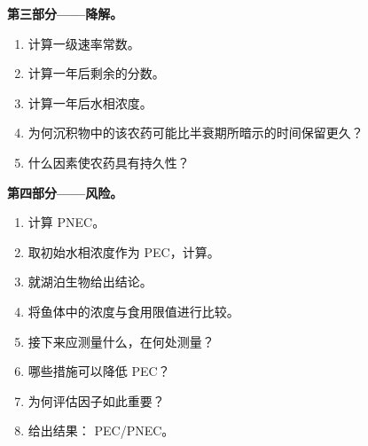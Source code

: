 \begin{problem}
\medskip\noindent\textbf{第三部分——降解。}
\begin{enumerate}[resume]
  \item 计算一级速率常数。
  \item 计算一年后剩余的分数。
  \item 计算一年后水相浓度。
  \item 为何沉积物中的该农药可能比半衰期所暗示的时间保留更久？
  \item 什么因素使农药具有持久性？
\end{enumerate}

\medskip\noindent\textbf{第四部分——风险。}
\begin{enumerate}[resume]
  \item 计算 PNEC。
  \item 取初始水相浓度作为 PEC，计算。
  \item 就湖泊生物给出结论。
  \item 将鱼体中的浓度与食用限值进行比较。
  \item 接下来应测量什么，在何处测量？
  \item 哪些措施可以降低 PEC？
  \item 为何评估因子如此重要？
  \item 给出结果： PEC/PNEC。
\end{enumerate}
\end{problem}
